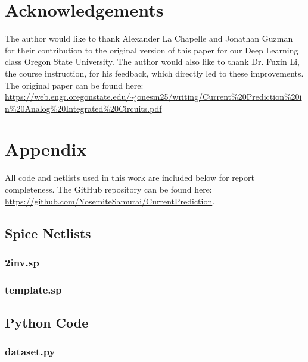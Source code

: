 \documentclass[10pt,twocolumn,letterpaper]{article}
\begin{document}
\section*{Acknowledgements}
\label{sec:acknowledgements}

The author would like to thank Alexander La Chapelle and Jonathan Guzman for their contribution to the original version of this paper for our Deep Learning class Oregon State University.  The author would also like to thank Dr. Fuxin Li, the course instruction, for his feedback, which directly led to these improvements.  The original paper can be found here: \url{https://web.engr.oregonstate.edu/~jonesm25/writing/Current%20Prediction%20in%20Analog%20Integrated%20Circuits.pdf}




\clearpage
\appendix
\onecolumn

\section*{Appendix}
\label{sec:appendix}

All code and netlists used in this work are included below for report completeness. The GitHub repository can be found here: \url{https://github.com/YosemiteSamurai/CurrentPrediction}.

\subsection*{Spice Netlists}
\label{appendix:netlists}

\subsubsection*{2inv.sp}
\label{netlist:2inv}


\subsubsection*{template.sp}
\label{netlist:template}


\subsection*{Python Code}
\label{appendix:python}

\subsubsection*{dataset.py}
\label{code:dataset}

\end{document}
